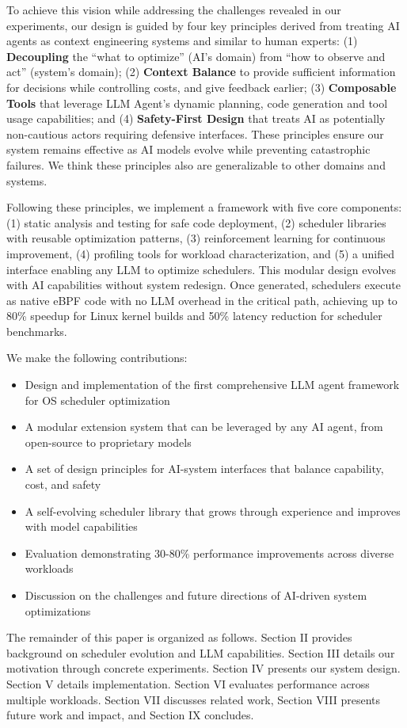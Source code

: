To achieve this vision while addressing the challenges revealed in our experiments, our design is guided by four key principles derived from treating AI agents as context engineering systems and similar to human experts: (1) \textbf{Decoupling} the ``what to optimize'' (AI's domain) from ``how to observe and act'' (system's domain); (2) \textbf{Context Balance} to provide sufficient information for decisions while controlling costs, and give feedback earlier; (3) \textbf{Composable Tools} that leverage LLM Agent's dynamic planning, code generation and tool usage capabilities; and (4) \textbf{Safety-First Design} that treats AI as potentially non-cautious actors requiring defensive interfaces. These principles ensure our system remains effective as AI models evolve while preventing catastrophic failures. We think these principles also are generalizable to other domains and systems.

Following these principles, we implement a framework with five core components: (1) static analysis and testing for safe code deployment, (2) scheduler libraries with reusable optimization patterns, (3) reinforcement learning for continuous improvement, (4) profiling tools for workload characterization, and (5) a unified interface enabling any LLM to optimize schedulers. This modular design evolves with AI capabilities without system redesign. Once generated, schedulers execute as native eBPF code with no LLM overhead in the critical path, achieving up to 80\% speedup for Linux kernel builds and 50\% latency reduction for scheduler benchmarks.

We make the following contributions:
\begin{itemize}
\item Design and implementation of the first comprehensive LLM agent framework for OS scheduler optimization
\item A modular extension system that can be leveraged by any AI agent, from open-source to proprietary models
\item A set of design principles for AI-system interfaces that balance capability, cost, and safety
\item A self-evolving scheduler library that grows through experience and improves with model capabilities
\item Evaluation demonstrating 30-80\% performance improvements across diverse workloads
\item Discussion on the challenges and future directions of AI-driven system optimizations
\end{itemize}

The remainder of this paper is organized as follows. Section II provides background on scheduler evolution and LLM capabilities. Section III details our motivation through concrete experiments. Section IV presents our system design. Section V details implementation. Section VI evaluates performance across multiple workloads. Section VII discusses related work, Section VIII presents future work and impact, and Section IX concludes.